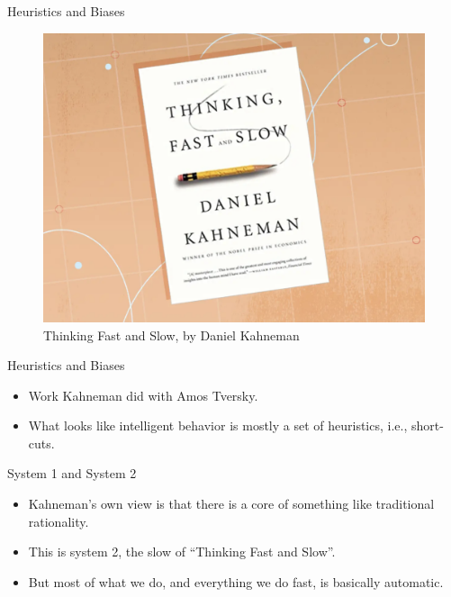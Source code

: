 \documentclass[
  17pt,
  letterpaper,
  ignorenonframetext,
  aspectratio=169,
]{beamer}
\providecommand{\tightlist}{%
  \setlength{\itemsep}{0pt}\setlength{\parskip}{0pt}}\usepackage{longtable,booktabs,array}
\begin{document}
\begin{frame}{Heuristics and Biases}
\protect\hypertarget{heuristics-and-biases}{}
\begin{figure}

{\centering \includegraphics[width=\textwidth,height=0.6\textheight]{../images/kahneman.png}

}

\caption{Thinking Fast and Slow, by Daniel Kahneman}

\end{figure}
\end{frame}

\begin{frame}{Heuristics and Biases}
\protect\hypertarget{heuristics-and-biases-1}{}
\begin{itemize}[<+->]
\tightlist
\item
  Work Kahneman did with Amos Tversky.
\item
  What looks like intelligent behavior is mostly a set of heuristics,
  i.e., short-cuts.
\end{itemize}
\end{frame}

\begin{frame}{System 1 and System 2}
\protect\hypertarget{system-1-and-system-2}{}
\begin{itemize}[<+->]
\tightlist
\item
  Kahneman's own view is that there is a core of something like
  traditional rationality.
\item
  This is system 2, the slow of ``Thinking Fast and Slow''.
\item
  But most of what we do, and everything we do fast, is basically
  automatic.
\end{itemize}
\end{frame}
\end{document}
